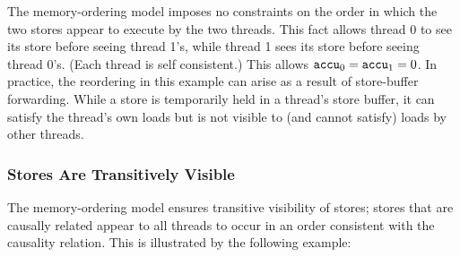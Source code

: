 \begin{table}[!hbt]
\noindent{}
\caption[Intra-Processor Forwarding is Allowed]{Intra-Processor Forwarding is Allowed \cite[Example 8-5]{ref:Intel}}
\label{tbl:litmus:intel:5}
\end{table}

\noindent
The memory-ordering model imposes no constraints on the order in which the two stores appear to execute by the two threads.
This fact allows thread 0 to see its store before seeing thread 1's, while thread 1 sees its store before seeing thread 0's.
(Each thread is self consistent.)
This allows $\texttt{accu}_0 = \texttt{accu}_1 = 0$.
\bigbreak
\noindent
In practice, the reordering in this example can arise as a result of store-buffer forwarding.
While a store is temporarily held in a thread's store buffer, it can satisfy the thread's own loads but is not visible to (and cannot satisfy) loads by other threads.

\newpage

\subsubsection*{Stores Are Transitively Visible}

The memory-ordering model ensures transitive visibility of stores; stores that are causally related appear to all threads to occur in an order consistent with the causality relation.
This is illustrated by the following example:

